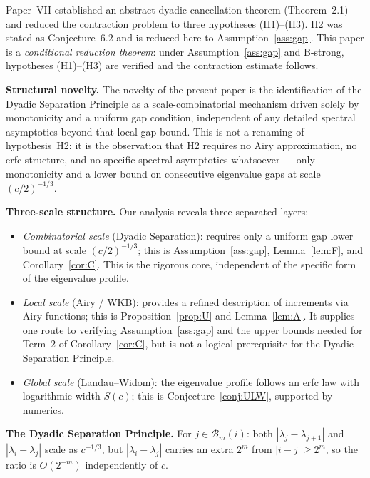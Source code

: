 \documentclass[12pt]{amsart}
\theoremstyle{definition}
\theoremstyle{remark}
\begin{document}
Paper~VII \cite{paperVII} established an abstract dyadic
cancellation theorem (Theorem~2.1) and reduced the
contraction problem to three hypotheses (H1)--(H3).
H2 was stated as Conjecture~6.2 and is reduced here
to Assumption~\ref{ass:gap}.
This paper is a \emph{conditional reduction theorem}:
under Assumption~\ref{ass:gap} and B-strong,
hypotheses (H1)--(H3) are verified and the contraction
estimate follows.

\medskip\noindent
\textbf{Structural novelty.}
The novelty of the present paper is the identification
of the Dyadic Separation Principle as a scale-combinatorial
mechanism driven solely by monotonicity and a uniform
gap condition, independent of any detailed spectral
asymptotics beyond that local gap bound.
This is not a renaming of hypothesis~H2: it is the
observation that H2 requires no Airy approximation,
no erfc structure, and no specific spectral asymptotics
whatsoever — only monotonicity and a lower bound on
consecutive eigenvalue gaps at scale $(c/2)^{-1/3}$.

\medskip\noindent
\textbf{Three-scale structure.}
Our analysis reveals three separated layers:
\begin{itemize}
\item \emph{Combinatorial scale} (Dyadic Separation):
  requires only a uniform gap lower bound at scale
  $(c/2)^{-1/3}$; this is Assumption~\ref{ass:gap},
  Lemma~\ref{lem:F}, and Corollary~\ref{cor:C}.
  This is the rigorous core, independent of the
  specific form of the eigenvalue profile.
\item \emph{Local scale} (Airy / WKB):
  provides a refined description of increments via
  Airy functions; this is Proposition~\ref{prop:U}
  and Lemma~\ref{lem:A}.
  It supplies one route to verifying
  Assumption~\ref{ass:gap} and the upper bounds
  needed for Term~2 of Corollary~\ref{cor:C},
  but is not a logical prerequisite for the
  Dyadic Separation Principle.
\item \emph{Global scale} (Landau--Widom):
  the eigenvalue profile follows an erfc law with
  logarithmic width $S(c)$; this is
  Conjecture~\ref{conj:ULW}, supported by numerics.
\end{itemize}

\medskip\noindent
\textbf{The Dyadic Separation Principle.}
For $j \in \mathcal{B}_m(i)$:
both $|\lambda_j-\lambda_{j+1}|$ and $|\lambda_i-\lambda_j|$
scale as $c^{-1/3}$, but $|\lambda_i-\lambda_j|$ carries
an extra $2^m$ from $|i-j| \ge 2^m$, so the ratio is
$O(2^{-m})$ independently of $c$.
\end{document}
